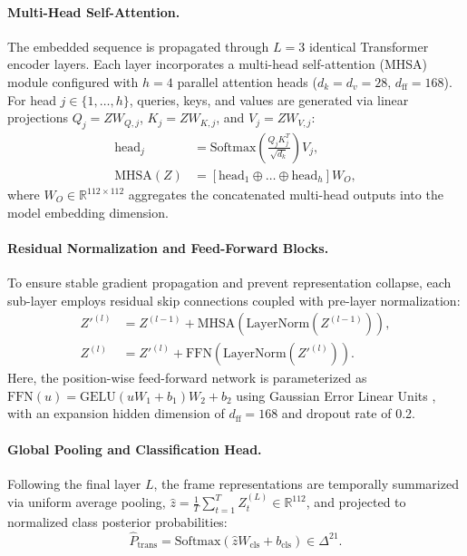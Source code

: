 \documentclass[preprint,12pt]{elsarticle}
\begin{document}
\paragraph{Multi-Head Self-Attention.} The embedded sequence is propagated through $L = 3$ identical Transformer encoder layers. Each layer incorporates a multi-head self-attention (MHSA) module configured with $h = 4$ parallel attention heads ($d_k = d_v = 28$, $d_{\text{ff}} = 168$). For head $j \in \{1, \dots, h\}$, queries, keys, and values are generated via linear projections $Q_j = Z W_{Q, j}$, $K_j = Z W_{K, j}$, and $V_j = Z W_{V, j}$:
\begin{align}
    \mathrm{head}_j &= \mathrm{Softmax}\left( \frac{Q_j K_j^T}{\sqrt{d_k}} \right) V_j, \\
    \mathrm{MHSA}(Z) &= \left[ \mathrm{head}_1 \oplus \dots \oplus \mathrm{head}_h \right] W_O,
\end{align}
where $W_O \in \mathbb{R}^{112 \times 112}$ aggregates the concatenated multi-head outputs into the model embedding dimension.

\paragraph{Residual Normalization and Feed-Forward Blocks.} To ensure stable gradient propagation and prevent representation collapse, each sub-layer employs residual skip connections coupled with pre-layer normalization:
\begin{align}
    Z'^{(l)} &= Z^{(l-1)} + \mathrm{MHSA}\left(\mathrm{LayerNorm}(Z^{(l-1)})\right), \\
    Z^{(l)}  &= Z'^{(l)} + \mathrm{FFN}\left(\mathrm{LayerNorm}(Z'^{(l)})\right).
\end{align}
Here, the position-wise feed-forward network is parameterized as $\mathrm{FFN}(u) = \mathrm{GELU}(u W_1 + b_1) W_2 + b_2$ using Gaussian Error Linear Units \cite{hendrycks2016}, with an expansion hidden dimension of $d_{\text{ff}} = 168$ and dropout rate of 0.2.

\paragraph{Global Pooling and Classification Head.} Following the final layer $L$, the frame representations are temporally summarized via uniform average pooling, $\hat{z} = \frac{1}{T} \sum_{t=1}^T Z_t^{(L)} \in \mathbb{R}^{112}$, and projected to normalized class posterior probabilities:
\begin{equation}
    \hat{P}_{\text{trans}} = \mathrm{Softmax}\left( \hat{z} W_{\text{cls}} + b_{\text{cls}} \right) \in \Delta^{21}.
\end{equation}
\end{document}

